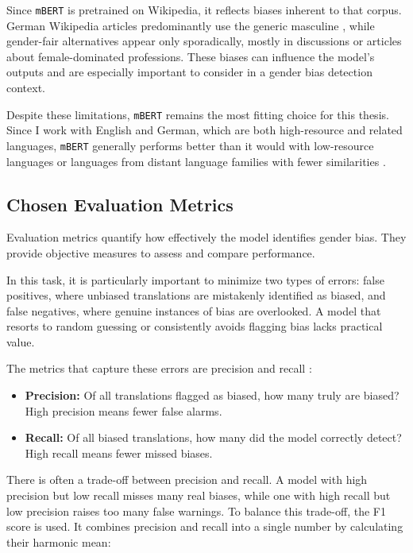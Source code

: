     Since \texttt{mBERT} is pretrained on Wikipedia, it reflects biases inherent to that corpus. German Wikipedia articles predominantly use the generic masculine \parencite{sichlerGenderDifferencesGermanlanguage2014}, while gender-fair alternatives appear only sporadically, mostly in discussions or articles about female-dominated professions. These biases can influence the model’s outputs and are especially important to consider in a gender bias detection context.

    Despite these limitations, \texttt{mBERT} remains the most fitting choice for this thesis. Since I work with English and German, which are both high-resource and related languages, \texttt{mBERT} generally performs better than it would with low-resource languages or languages from distant language families with fewer similarities \parencite{lauscherZeroHeroLimitations2020}.

\subsection{Chosen Evaluation Metrics}
    Evaluation metrics quantify how effectively the model identifies gender bias. They provide objective measures to assess and compare performance.

    In this task, it is particularly important to minimize two types of errors: false positives, where unbiased translations are mistakenly identified as biased, and false negatives, where genuine instances of bias are overlooked. A model that resorts to random guessing or consistently avoids flagging bias lacks practical value.

    The metrics that capture these errors are precision and recall \parencite{rainioEvaluationMetricsStatistical2024}:

\begin{itemize}
    \item \textbf{Precision:} Of all translations flagged as biased, how many truly are biased? High precision means fewer false alarms.
    \item \textbf{Recall:} Of all biased translations, how many did the model correctly detect? High recall means fewer missed biases.
\end{itemize}

There is often a trade-off between precision and recall. A model with high precision but low recall misses many real biases, while one with high recall but low precision raises too many false warnings. To balance this trade-off, the F1 score is used. It combines precision and recall into a single number by calculating their harmonic mean:

